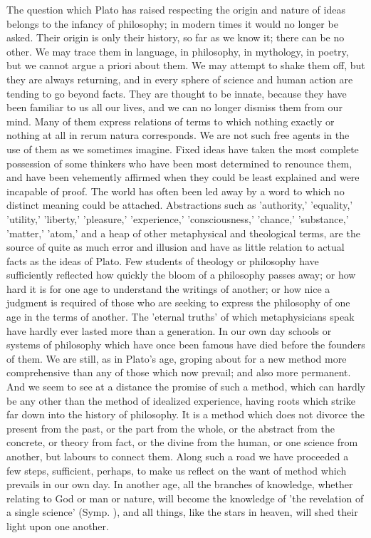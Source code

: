 \documentclass[11pt,letter]{article}
\begin{document}
\par  The question which Plato has raised respecting the origin and nature of ideas belongs to the infancy of philosophy; in modern times it would no longer be asked. Their origin is only their history, so far as we know it; there can be no other. We may trace them in language, in philosophy, in mythology, in poetry, but we cannot argue a priori about them. We may attempt to shake them off, but they are always returning, and in every sphere of science and human action are tending to go beyond facts. They are thought to be innate, because they have been familiar to us all our lives, and we can no longer dismiss them from our mind. Many of them express relations of terms to which nothing exactly or nothing at all in rerum natura corresponds. We are not such free agents in the use of them as we sometimes imagine. Fixed ideas have taken the most complete possession of some thinkers who have been most determined to renounce them, and have been vehemently affirmed when they could be least explained and were incapable of proof. The world has often been led away by a word to which no distinct meaning could be attached. Abstractions such as 'authority,' 'equality,' 'utility,' 'liberty,' 'pleasure,' 'experience,' 'consciousness,' 'chance,' 'substance,' 'matter,' 'atom,' and a heap of other metaphysical and theological terms, are the source of quite as much error and illusion and have as little relation to actual facts as the ideas of Plato. Few students of theology or philosophy have sufficiently reflected how quickly the bloom of a philosophy passes away; or how hard it is for one age to understand the writings of another; or how nice a judgment is required of those who are seeking to express the philosophy of one age in the terms of another. The 'eternal truths' of which metaphysicians speak have hardly ever lasted more than a generation. In our own day schools or systems of philosophy which have once been famous have died before the founders of them. We are still, as in Plato's age, groping about for a new method more comprehensive than any of those which now prevail; and also more permanent. And we seem to see at a distance the promise of such a method, which can hardly be any other than the method of idealized experience, having roots which strike far down into the history of philosophy. It is a method which does not divorce the present from the past, or the part from the whole, or the abstract from the concrete, or theory from fact, or the divine from the human, or one science from another, but labours to connect them. Along such a road we have proceeded a few steps, sufficient, perhaps, to make us reflect on the want of method which prevails in our own day. In another age, all the branches of knowledge, whether relating to God or man or nature, will become the knowledge of 'the revelation of a single science' (Symp. ), and all things, like the stars in heaven, will shed their light upon one another.
\end{document}
